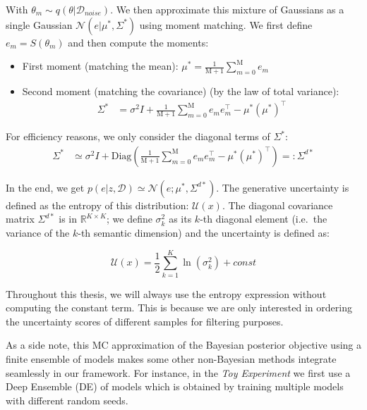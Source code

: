 With $\theta_m \sim q(\theta|\mathcal{D}_{noise})$. We then approximate this mixture of Gaussians as a single Gaussian $\mathcal{N}(e|\mu^*,\Sigma^*)$ using moment matching. We first define $e_m = S(\theta_m)$ and then compute the moments:
\begin{itemize}
    \item First moment (matching the mean): $\mu^* = \frac{1}{\mathrm{M}+1} \sum^{\mathrm{M}}_{m=0} e_m$
    \item Second moment (matching the covariance) (by the law of total variance):
    \begin{align}
    \Sigma^* &= \sigma^2 I + \frac{1}{\mathrm{M}+1} \sum^\mathrm{M}_{m=0} e_m e_m^\top - \mu^*(\mu^*)^\top
    \end{align}
\end{itemize}

For efficiency reasons, we only consider the diagonal terms of $\Sigma^*$:
\begin{align}
    \Sigma^* &\simeq \sigma^2 I + \text{Diag}\left(\frac{1}{\mathrm{M}+1}\sum^\mathrm{M}_{m=0} e_m e_m^\top - \mu^*(\mu^*)^\top \right) =: \Sigma^{d*}
\end{align}

In the end, we get $p(e|z,\mathcal{D}) \simeq \mathcal{N}(e;\mu^*,\Sigma^{d*})$. The generative uncertainty is defined as the entropy of this distribution: $\mathcal{U}(x)$.
The diagonal covariance matrix $\Sigma^{d*}$ is in $\mathbb{R}^{K\times K}$; we define $\sigma_k^2$ as its $k$-th diagonal element (i.e.\ the variance of the $k$-th semantic dimension) and the uncertainty is defined as:

\begin{equation}
\mathcal{U}(x) = \frac{1}{2} \sum_{k=1}^K \ln(\sigma_{k}^2) + const
\end{equation}

\begin{tcolorbox}[colback=orange!10!white,colframe=orange!50!black,sharp corners]
Throughout this thesis, we will always use the entropy expression without computing the constant term. This is because we are only interested in ordering the uncertainty scores of different samples for filtering purposes.
\end{tcolorbox}

As a side note, this \acs{MC} approximation of the Bayesian posterior objective using a finite ensemble of models makes some other non-Bayesian methods integrate seamlessly in our framework. For instance, in the \textit{Toy Experiment} we first use a Deep Ensemble (\acs{DE}) of models which is obtained by training multiple models with different random seeds.

